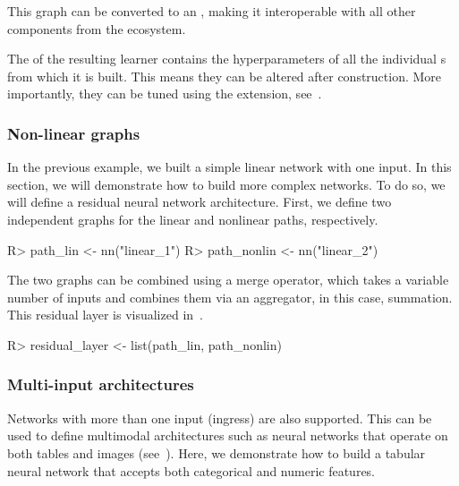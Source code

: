 \documentclass[article]{jss}
\theoremstyle{definition}
\begin{document}
This graph can be converted to an , making it interoperable with all other components from the  ecosystem.


The  of the resulting learner contains the hyperparameters of all the individual s from which it is built.
This means they can be altered after construction.
More importantly, they can be tuned using the  extension, see~.

\subsubsection{Non-linear graphs}\label{sec:complex-architectures}

In the previous example, we built a simple linear network with one input.
In this section, we will demonstrate how to build more complex networks.
To do so, we will define a residual neural network architecture.
First, we define two independent graphs for the linear and nonlinear paths, respectively.

\begin{CodeInput}
R> path_lin <- nn("linear_1")
R> path_nonlin <- nn("linear_2") %
\end{CodeInput}

The two graphs can be combined using a merge operator, which takes a variable number of inputs and combines them via an aggregator, in this case, summation.
This residual layer is visualized in~.

\begin{CodeInput}
R> residual_layer <- list(path_lin, path_nonlin) %
\end{CodeInput}

\subsubsection{Multi-input architectures}

Networks with more than one input (ingress) are also supported.
This can be used to define multimodal architectures such as neural networks that operate on both tables and images (see~).
Here, we demonstrate how to build a tabular neural network that accepts both categorical and numeric features.
\end{document}
